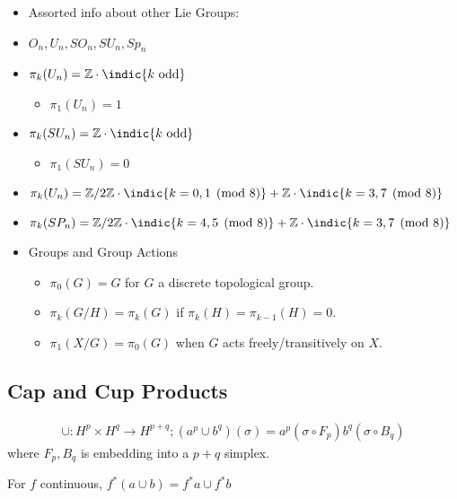 \begin{itemize}
\item
  Assorted info about other Lie Groups:
\item
  \(O_n, U_n, SO_n, SU_n, Sp_n\)
\item
  \(\pi_k(U_n) = {\mathbb{Z}}\cdot\indic{k~\text{odd}}\)

  \begin{itemize}
  \tightlist
  \item
    \(\pi_1(U_n) = 1\)
  \end{itemize}
\item
  \(\pi_k(SU_n) = {\mathbb{Z}}\cdot\indic{k~\text{odd}}\)

  \begin{itemize}
  \tightlist
  \item
    \(\pi_1(SU_n) = 0\)
  \end{itemize}
\item
  \(\pi_k(U_n) = {\mathbb{Z}}/2{\mathbb{Z}}\cdot\indic{k = 0,1\pmod 8} + {\mathbb{Z}}\cdot\indic{k = 3,7 \pmod 8}\)
\item
  \(\pi_k(SP_n) = {\mathbb{Z}}/2{\mathbb{Z}}\cdot\indic{k = 4,5\pmod 8} + {\mathbb{Z}}\cdot\indic{k = 3,7 \pmod 8}\)
\item
  Groups and Group Actions

  \begin{itemize}
  \tightlist
  \item
    \(\pi_0(G) = G\) for \(G\) a discrete topological group.
  \item
    \(\pi_k(G/H) = \pi_k(G)\) if \(\pi_k(H) = \pi_{k-1}(H) = 0\).
  \item
    \(\pi_1(X/G) = \pi_0(G)\) when \(G\) acts freely/transitively on
    \(X\).
  \end{itemize}
\end{itemize}

\hypertarget{cap-and-cup-products}{%
\subsection{Cap and Cup Products}\label{cap-and-cup-products}}

\begin{align*}
\cup: H^p \times H^q \to H^{p+q}; (a^p \cup b^q)(\sigma) = a^p(\sigma \circ F_p) b^q(\sigma \circ B_q)
\end{align*}
where \(F_p, B_q\) is embedding into a \(p+q\) simplex.

For \(f\) continuous, \(f^*(a\cup b) = f^*a \cup f^*b\)

